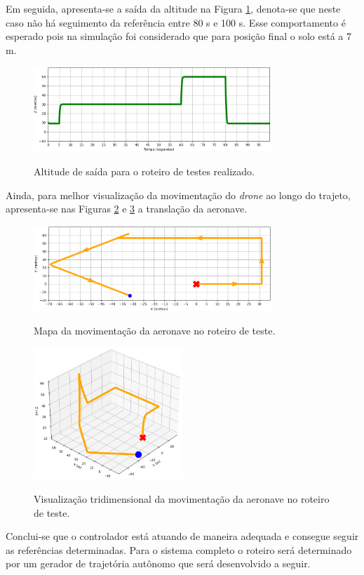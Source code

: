 \documentclass[main.tex]{subfiles}
\begin{document}
Em seguida, apresenta-se a saída da altitude na Figura \ref{fig:teste_atitude_altitude}, denota-se que neste caso não há seguimento da referência entre 80 s e 100 s. Esse comportamento é esperado pois na simulação foi considerado que para posição final o solo está a 7 m.

\begin{figure}[!h]
    \centering
    \caption{Altitude de saída para o roteiro de testes realizado.}
    \includegraphics[width=0.8\textwidth]{capitulos/controle_atitude/imgs/teste_atitude_altitude.png}
    \label{fig:teste_atitude_altitude}
\end{figure}

\vspace{10cm}

Ainda, para melhor visualização da movimentação do \textit{drone} ao longo do trajeto, apresenta-se nas Figuras \ref{fig:teste_atitude_mapa} e \ref{fig:teste_atitude_mapa_3d} a translação da aeronave.

\begin{figure}[!h]
    \centering
    \caption{Mapa da movimentação da aeronave no roteiro de teste.}
    \includegraphics[width=0.8\textwidth]{capitulos/controle_atitude/imgs/teste_atitude_mapa.png}
    \label{fig:teste_atitude_mapa}
\end{figure}

\begin{figure}[!h]
    \centering
    \caption{Visualização tridimensional da movimentação da aeronave no roteiro de teste.}
    \includegraphics[width=0.5\textwidth]{capitulos/controle_atitude/imgs/teste_atitude_mapa_3d.png}
    \label{fig:teste_atitude_mapa_3d}
\end{figure}

Conclui-se que o controlador está atuando de maneira adequada e consegue seguir as referências determinadas. Para o sistema completo o roteiro será determinado por um gerador de trajetória autônomo que será desenvolvido a seguir.
\end{document}
